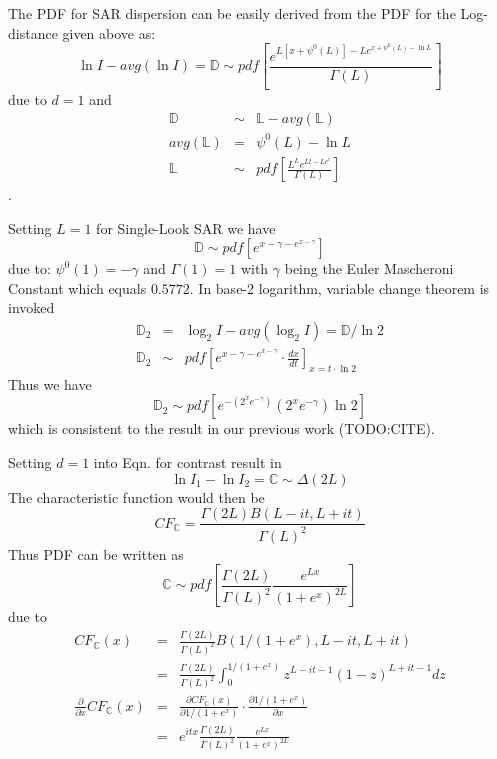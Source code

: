 The PDF for SAR dispersion can be easily derived from
  the PDF for the Log-distance given above as:
  \begin{equation}
   \ln{I} - avg(\ln{I}) =  \mathbb{D} \sim pdf \left[ \frac{e^{L[x+\psi^0(L)]-Le^{x+\psi^0(L)-\ln{L}}}}{\Gamma(L)} \right]
  \end{equation}
due to $d=1$ and
\begin{eqnarray*}
  \mathbb{D} &\sim& \mathbb{L} - avg(\mathbb{L}) \\
  avg(\mathbb{L}) &=& \psi^0(L) - \ln{L} \\
  \mathbb{L} &\sim& pdf \left[ \frac{L^Le^{Lt-Le^t}}{ \Gamma(L)}  \right]
\end{eqnarray*}.

Setting $L=1$ for Single-Look SAR we have
\begin{equation}
  \mathbb{D} \sim pdf \left[ e^{x-\gamma-e^{x-\gamma}} \right]
\end{equation}
due to: $\psi^0(1)=-\gamma$ and $\Gamma(1)=1$
with $\gamma$ being the Euler Mascheroni Constant which equals $0.5772$. 
In base-2 logarithm, variable change theorem is invoked
\begin{eqnarray*}
  \mathbb{D}_2 &=& \log_2{I} - avg(\log_2{I}) = \mathbb{D}/\ln{2} \\
  \mathbb{D}_2 &\sim& pdf \left[ e^{x-\gamma-e^{x-\gamma}} \cdot \frac{dx}{dt} \right]_{x=t \cdot \ln2}
\end{eqnarray*}
Thus we have
\begin{equation}
  \mathbb{D}_2 \sim pdf \left[ e^{-(2^xe^{-\gamma})} (2^xe^{-\gamma}) \ln2 \right]
\end{equation}
which is consistent to the result in our previous work (TODO:CITE).

Setting $d=1$ into Eqn. for contrast result in
\begin{equation}
  \ln{I_1} - \ln{I_2} = \mathbb{C} \sim \Delta(2L)
\end{equation}
The characteristic function would then be
\begin{equation}
  CF_\mathbb{C} =  \frac{\Gamma(2L) B(L-it,L+it)}{\Gamma(L)^2} 
\end{equation}
Thus PDF can be written as
\begin{equation}
  \mathbb{C} \sim pdf \left[ \frac{\Gamma(2L) }{\Gamma(L)^2} \frac{e^{Lx}}{(1+e^x)^{2L}} \right] \label{eqn:multi_look_SAR_contrast_pdf}
\end{equation}
due to
\begin{eqnarray*}
  CF_{\mathbb{C}}(x) &=& \frac{\Gamma(2L) }{\Gamma(L)^2} B(1/(1+e^x),L-it,L+it)  \\
       &=& \frac{\Gamma(2L) }{\Gamma(L)^2} \int^{1/(1+e^x)}_0 z^{L-it-1}(1-z)^{L+it-1} dz \\
  \frac{\partial }{\partial x} CF_{\mathbb{C}}(x) &=&  \frac{\partial CF_{\mathbb{C}}(x) }{\partial 1/(1+e^x)} \cdot \frac{\partial 1/(1+e^x)}{\partial x} \\
        &=&  e^{itx} \frac{\Gamma(2L) }{\Gamma(L)^2} \frac{e^{Lx}}{(1+e^x)^{2L}}   
\end{eqnarray*}

